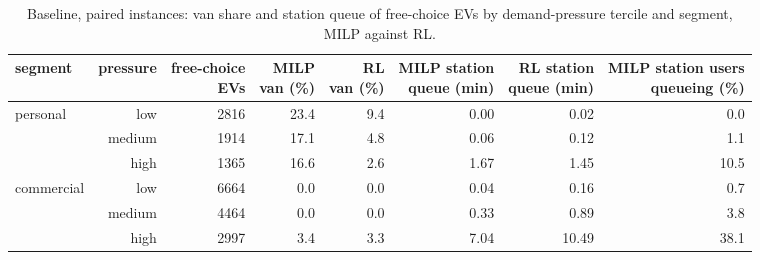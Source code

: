 \begin{table}[H]\centering
\small
\caption{Baseline, paired instances: van share and station queue of free-choice EVs by demand-pressure tercile and segment, MILP against RL.}\label{tab:pressm}
\begin{adjustbox}{max width=\textwidth}\begin{tabular}{lrrrrrrr}\toprule
segment & pressure & \shortstack{free-choice\\EVs} & \shortstack{MILP\\van (\%)} & \shortstack{RL\\van (\%)} & \shortstack{MILP station\\queue (min)} & \shortstack{RL station\\queue (min)} & \shortstack{MILP station users\\queueing (\%)} \\ \midrule
personal & low & 2816 & 23.4 & 9.4 & 0.00 & 0.02 & 0.0 \\
 & medium & 1914 & 17.1 & 4.8 & 0.06 & 0.12 & 1.1 \\
 & high & 1365 & 16.6 & 2.6 & 1.67 & 1.45 & 10.5 \\
commercial & low & 6664 & 0.0 & 0.0 & 0.04 & 0.16 & 0.7 \\
 & medium & 4464 & 0.0 & 0.0 & 0.33 & 0.89 & 3.8 \\
 & high & 2997 & 3.4 & 3.3 & 7.04 & 10.49 & 38.1 \\
\bottomrule\end{tabular}\end{adjustbox}\end{table}
